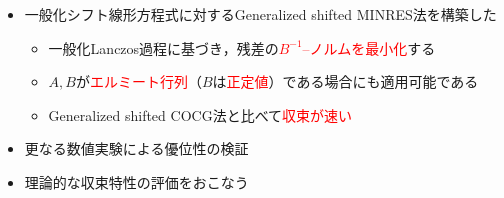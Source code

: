 
\begin{itemize}
	\item 一般化シフト線形方程式に対するGeneralized shifted MINRES法を構築した
		\begin{itemize}
			\item 一般化Lanczos過程に基づき，残差の\textcolor{red}{$B^{-1}$--ノルムを最小化}する
			\item $A, B$が\textcolor{red}{エルミート行列}（$B$は\textcolor{red}{正定値}）である場合にも適用可能である
			\item Generalized shifted COCG法と比べて\textcolor{red}{収束が速い}
		\end{itemize}
	\item 更なる数値実験による優位性の検証
	\item 理論的な収束特性の評価をおこなう
\end{itemize}